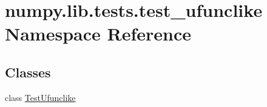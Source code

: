 \hypertarget{namespacenumpy_1_1lib_1_1tests_1_1test__ufunclike}{}\section{numpy.\+lib.\+tests.\+test\+\_\+ufunclike Namespace Reference}
\label{namespacenumpy_1_1lib_1_1tests_1_1test__ufunclike}
\subsection*{Classes}
\begin{DoxyCompactItemize}
\item 
class \hyperlink{classnumpy_1_1lib_1_1tests_1_1test__ufunclike_1_1TestUfunclike}{Test\+Ufunclike}
\end{DoxyCompactItemize}
